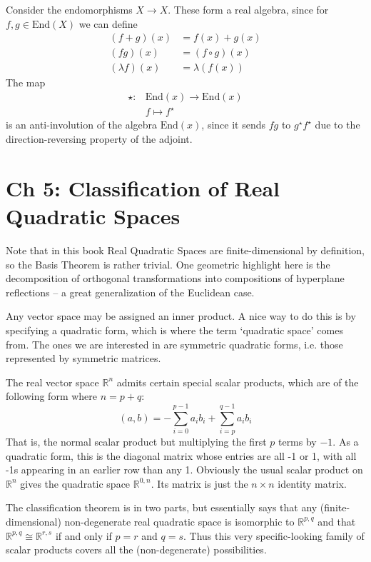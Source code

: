 \documentclass[oneside,english]{amsbook}
\numberwithin{section}{chapter}
\theoremstyle{plain}
\theoremstyle{definition}
\begin{document}
Consider the endomorphisms $X\to X$. These form a real algebra, since for $f, g\in\text{End}(X)$ we can define
\begin{align}
	(f + g)(x) & = f(x) + g(x) \\
	(fg)(x)& = (f\circ g)(x) \\
	(\lambda f)(x)& = \lambda(f(x)) 
\end{align}
The map
\begin{align}
	\star: & 	\text{End}(x)\to \text{End}(x) \\
		   & f\mapsto f^\star
\end{align}
is an anti-involution of the algebra $\text{End}(x)$, since it sends $fg$ to $g^\star f^\star$ due to the direction-reversing property of the adjoint.

\section{Ch 5: Classification of Real Quadratic Spaces}

Note that in this book Real Quadratic Spaces are finite-dimensional by definition, so the Basis Theorem is rather trivial. One geometric highlight here is the decomposition of orthogonal transformations into compositions of hyperplane reflections -- a great generalization of the Euclidean case.

Any vector space may be assigned an inner product. A nice way to do this is by specifying a quadratic form, which is where the term `quadratic space' comes from. The ones we are interested in are symmetric quadratic forms, i.e. those represented by symmetric matrices. 

The real vector space $\mathbb{R}^n$ admits certain special scalar products, which are of the following form where $n = p + q$:
\[
	(a, b) = -\sum_{i=0}^{p - 1}a_ib_i + \sum_{i=p}^{q - 1}a_ib_i
\]
That is, the normal scalar product but multiplying the first $p$ terms by $-1$. As a quadratic form, this is the diagonal matrix whose entries are all -1 or 1, with all -1s appearing in an earlier row than any 1. Obviously the usual scalar product on $\mathbb{R}^n$ gives the quadratic space $\mathbb{R}^{0, n}$. Its matrix is just the $n\times n$ identity matrix.

The classification theorem is in two parts, but essentially says that any (finite-dimensional) non-degenerate real quadratic space is isomorphic to $\mathbb{R}^{p, q}$ and that $\mathbb{R}^{p, q}\cong \mathbb{R}^{r, s}$ if and only if $p = r$ and $q = s$. Thus this very specific-looking family of scalar products covers all the (non-degenerate) possibilities.
\end{document}
